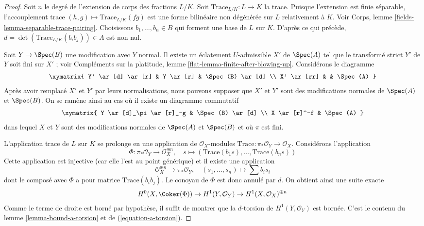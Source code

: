 \begin{proof} Soit $n$ le degré de l'extension de corps des fractions $L/K$. Soit $\text{Trace}_{L/K} : L \to K$ la trace. Puisque l'extension est finie séparable, l'accouplement trace $(h, g) \mapsto \text{Trace}_{L/K}(fg)$ est une forme bilinéaire non dégénérée sur $L$ relativement à $K$. Voir Corps, lemme \ref{fields-lemma-separable-trace-pairing}. Choisissons $b_1, \ldots, b_n \in B$ qui forment une base de $L$ sur $K$. D'après ce qui précède, $d = \det(\text{Trace}_{L/K}(b_ib_j)) \in A$ est non nul.

\medskip\noindent Soit $Y \to \Spec(B)$ une modification avec $Y$ normal. Il existe un éclatement $U$-admissible $X'$ de $\Spec(A)$ tel que le transformé strict $Y'$ de $Y$ soit fini sur $X'$ ; voir Compléments sur la platitude, lemme \ref{flat-lemma-finite-after-blowing-up}. Considérons le diagramme $$
\xymatrix{
Y' \ar[d] \ar[r] & Y \ar[r] & \Spec(B) \ar[d] \\
X' \ar[rr] & & \Spec(A)
}
$$ Après avoir remplacé $X'$ et $Y'$ par leurs normalisations, nous pouvons supposer que $X'$ et $Y'$ sont des modifications normales de $\Spec(A)$ et $\Spec(B)$. On se ramène ainsi au cas où il existe un diagramme commutatif $$
\xymatrix{
Y \ar[d]_\pi \ar[r]_-g & \Spec(B) \ar[d] \\
X \ar[r]^-f & \Spec(A)
}
$$ dans lequel $X$ et $Y$ sont des modifications normales de $\Spec(A)$ et $\Spec(B)$ et où $\pi$ est fini.

\medskip\noindent L'application trace de $L$ sur $K$ se prolonge en une application de $\mathcal{O}_X$-modules $\text{Trace} : \pi_*\mathcal{O}_Y \to \mathcal{O}_X$. Considérons l'application $$
\Phi : \pi_*\mathcal{O}_Y \longrightarrow \mathcal{O}_X^{\oplus n},\quad
s \longmapsto (\text{Trace}(b_1s), \ldots, \text{Trace}(b_ns))
$$ Cette application est injective (car elle l'est au point générique) et il existe une application $$
\mathcal{O}_X^{\oplus n} \longrightarrow \pi_*\mathcal{O}_Y,\quad
(s_1, \ldots, s_n) \longmapsto \sum b_i s_i
$$ dont le composé avec $\Phi$ a pour matrice $\text{Trace}(b_ib_j)$. Le conoyau de $\Phi$ est donc annulé par $d$. On obtient ainsi une suite exacte $$
H^0(X, \Coker(\Phi)) \to H^1(Y, \mathcal{O}_Y) \to
H^1(X, \mathcal{O}_X)^{\oplus n}
$$ Comme le terme de droite est borné par hypothèse, il suffit de montrer que la $d$-torsion de $H^1(Y, \mathcal{O}_Y)$ est bornée. C'est le contenu du lemme \ref{lemma-bound-a-torsion} et de (\ref{equation-a-torsion}). \end{proof}

